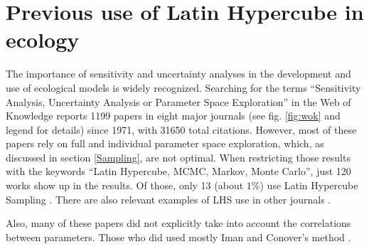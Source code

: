 \section{Previous use of Latin Hypercube in ecology}\label{Studies}
The importance of sensitivity and uncertainty analyses in the development 
and use of ecological models is widely recognized. Searching for the terms
``Sensitivity Analysis, Uncertainty Analysis or Parameter Space
Exploration'' in the Web of Knowledge reports 1199 papers in eight major
journals (see fig. \ref{fig:wok} and legend for details) since 1971, 
with 31650 total
citations. However,
most of these papers rely on full and individual parameter space
exploration, which, as discussed in section \ref{Sampling}, are not
optimal. When restricting those results with the keywords ``Latin Hypercube,
MCMC, Markov, Monte Carlo'', just 120 works show up in the results. Of 
those, only 13 (about $1\%$) use Latin Hypercube Sampling 
\citep{Berthaume12, Confalonieri10, Meyer07, Tiemeyer07, Xu05,
Moore04, Shirley03, Duchesne03, Reed84, Marino08, Nathan01, Hamilton10,
Lovvorn96}. There are also relevant examples of LHS use in other
journals \citep{Estill12, Fisher10, Thebault10}.

Also, many of these papers did not explicitly take into account the
correlations between parameters. Those who did used mostly Iman and 
Conover's method \citep{ImanConover82}. 

